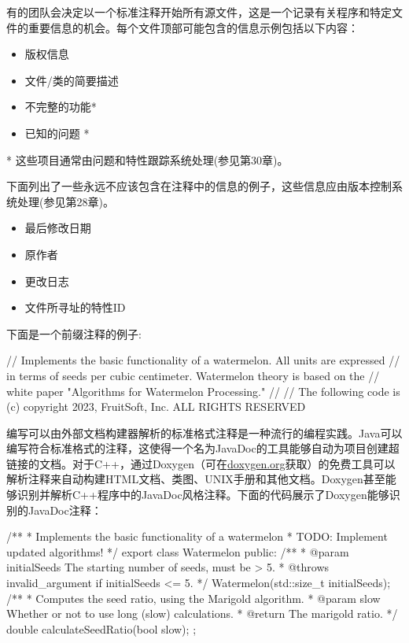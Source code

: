 
有的团队会决定以一个标准注释开始所有源文件，这是一个记录有关程序和特定文件的重要信息的机会。每个文件顶部可能包含的信息示例包括以下内容：

\begin{itemize}
\item
版权信息

\item
文件/类的简要描述

\item
不完整的功能*

\item
已知的问题 *
\end{itemize}

* 这些项目通常由问题和特性跟踪系统处理(参见第30章)。

下面列出了一些永远不应该包含在注释中的信息的例子，这些信息应由版本控制系统处理(参见第28章)。

\begin{itemize}
\item
最后修改日期

\item
原作者

\item
更改日志

\item
文件所寻址的特性ID
\end{itemize}

下面是一个前缀注释的例子:

\begin{cpp}
// Implements the basic functionality of a watermelon. All units are expressed
// in terms of seeds per cubic centimeter. Watermelon theory is based on the
// white paper "Algorithms for Watermelon Processing."
//
// The following code is (c) copyright 2023, FruitSoft, Inc. ALL RIGHTS RESERVED
\end{cpp}


编写可以由外部文档构建器解析的标准格式注释是一种流行的编程实践。Java可以编写符合标准格式的注释，这使得一个名为JavaDoc的工具能够自动为项目创建超链接的文档。对于C++，通过Doxygen（可在\url{doxygen.org}获取）的免费工具可以解析注释来自动构建HTML文档、类图、UNIX手册和其他文档。Doxygen甚至能够识别并解析C++程序中的JavaDoc风格注释。下面的代码展示了Doxygen能够识别的JavaDoc注释：

\begin{cpp}
/**
* Implements the basic functionality of a watermelon
* TODO: Implement updated algorithms!
*/
export class Watermelon
{
    public:
        /**
         * @param initialSeeds The starting number of seeds, must be > 5.
         * @throws invalid_argument if initialSeeds <= 5.
         */
        Watermelon(std::size_t initialSeeds);
        /**
         * Computes the seed ratio, using the Marigold algorithm.
         * @param slow Whether or not to use long (slow) calculations.
         * @return The marigold ratio.
         */
        double calculateSeedRatio(bool slow);
};
\end{cpp}

